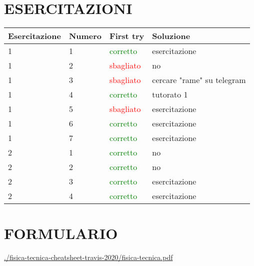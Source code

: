 \documentclass[a4paper, 9pt]{article}
\begin{document}
    \section{ESERCITAZIONI}
    \begin{tabular}{llll}
        \textbf{Esercitazione} & \textbf{Numero} & \textbf{First try} & \textbf{Soluzione}\\
        \hline
        1 & 1 & \textcolor{green}{corretto} & esercitazione\\
        1 & 2 & \textcolor{red}{sbagliato} & no\\
        1 & 3 & \textcolor{red}{sbagliato} & cercare "rame" su telegram\\
        1 & 4 & \textcolor{green}{corretto} & tutorato 1\\
        1 & 5 & \textcolor{red}{sbagliato} & esercitazione\\
        1 & 6 & \textcolor{green}{corretto} & esercitazione\\
        1 & 7 & \textcolor{green}{corretto} & esercitazione\\
        \hline
        2 & 1 & \textcolor{green}{corretto} & no\\
        2 & 2 & \textcolor{green}{corretto} & no\\
        2 & 3 & \textcolor{green}{corretto} & esercitazione\\
        2 & 4 & \textcolor{green}{corretto} & esercitazione\\
    \end{tabular}
    \section{FORMULARIO}
    \url{./fisica-tecnica-cheatsheet-travis-2020/fisica-tecnica.pdf}
\end{document}
